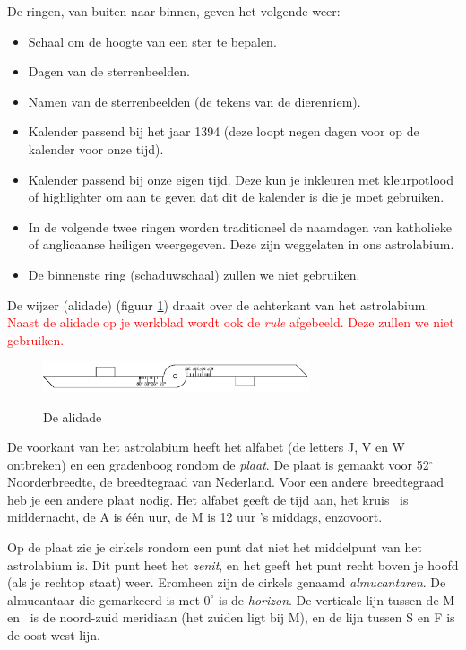 De ringen, van buiten naar binnen, geven het volgende weer:
\begin{itemize}
 \item Schaal om de hoogte van een ster te bepalen.
 \item Dagen van de sterrenbeelden.
 \item Namen van de sterrenbeelden (de tekens van de dierenriem).
 \item Kalender passend bij het jaar 1394 (deze loopt negen dagen voor op de kalender voor onze tijd).
 \item Kalender passend bij onze eigen tijd. Deze kun je inkleuren met kleurpotlood of highlighter om aan te geven dat dit de kalender is die je moet gebruiken.
 \item In de volgende twee ringen worden traditioneel de naamdagen van katholieke of anglicaanse heiligen weergegeven. Deze zijn weggelaten in ons astrolabium.
 \item De binnenste ring (schaduwschaal) zullen we niet gebruiken.
\end{itemize}

De wijzer (alidade) (figuur \ref{alidade}) draait over de achterkant van het astrolabium. \textcolor{red}{Naast de alidade op je werkblad wordt ook de \textit{rule} afgebeeld. Deze zullen we niet gebruiken.}

\begin{figure}
\centering
 \includegraphics[width=0.7\textwidth]{astrolabiumNL/alidade}
 \label{alidade}
 \caption{De alidade}
\end{figure}

De voorkant van het astrolabium heeft het alfabet (de letters J, V en W ontbreken) en een gradenboog rondom de \textit{plaat}. De plaat is gemaakt voor 52$^\circ$ Noorderbreedte, de breedtegraad van Nederland. Voor een andere breedtegraad heb je een andere plaat nodig. Het alfabet geeft de tijd aan, het kruis \kreuz\ is middernacht, de A is \'e\'en uur, de M is 12 uur 's middags, enzovoort.

Op de plaat zie je cirkels rondom een punt dat niet het middelpunt van het astrolabium is. Dit punt heet het \textit{zenit}, en het geeft het punt recht boven je hoofd (als je rechtop staat) weer. Eromheen zijn de cirkels genaamd \textit{almucantaren}. De almucantaar die gemarkeerd is met $0^\circ$ is de \textit{horizon}. De verticale lijn tussen de M en \kreuz\ is de noord-zuid meridiaan (het zuiden ligt bij M), en de lijn tussen S en F is de oost-west lijn.

